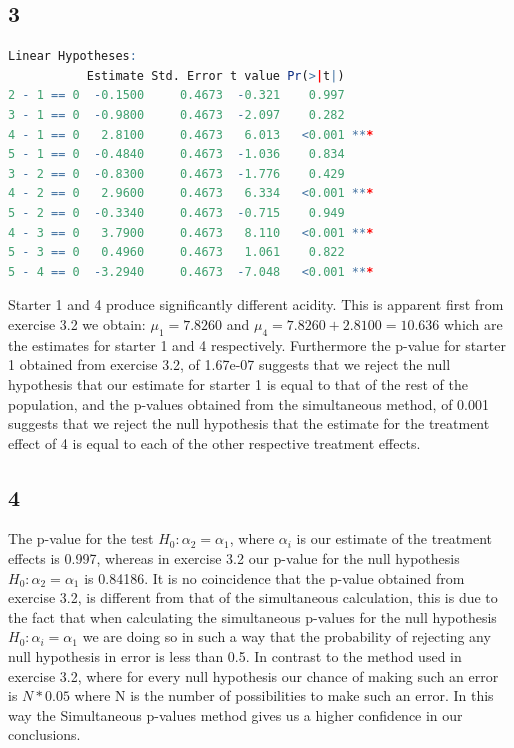 \documentclass{article}
\begin{document}
    \subsection*{3}
      \begin{lstlisting}[language=R]
Linear Hypotheses:
           Estimate Std. Error t value Pr(>|t|)    
2 - 1 == 0  -0.1500     0.4673  -0.321    0.997    
3 - 1 == 0  -0.9800     0.4673  -2.097    0.282    
4 - 1 == 0   2.8100     0.4673   6.013   <0.001 ***
5 - 1 == 0  -0.4840     0.4673  -1.036    0.834    
3 - 2 == 0  -0.8300     0.4673  -1.776    0.429    
4 - 2 == 0   2.9600     0.4673   6.334   <0.001 ***
5 - 2 == 0  -0.3340     0.4673  -0.715    0.949    
4 - 3 == 0   3.7900     0.4673   8.110   <0.001 ***
5 - 3 == 0   0.4960     0.4673   1.061    0.822    
5 - 4 == 0  -3.2940     0.4673  -7.048   <0.001 ***
      \end{lstlisting}
      \label{tble:p-values}
        Starter 1 and 4 produce significantly different acidity. This is apparent first from exercise 3.2 we obtain: $\mu_1 = 7.8260$ and $\mu_4 = 7.8260 + 2.8100 = 10.636$ which are the estimates for starter 1 and 4 respectively. Furthermore the p-value for starter 1 obtained from exercise 3.2, of 1.67e-07 suggests that we reject the null hypothesis that our estimate for starter 1 is equal to that of the rest of the population, and the p-values obtained from the simultaneous method, of 0.001 suggests that we reject the null hypothesis that the estimate for the treatment effect of 4 is equal to each of the other respective treatment effects.
    \subsection*{4}
    The p-value for the test $H_0: \alpha_2 = \alpha_1$, where $\alpha_i$ is our estimate of the treatment effects is 0.997, whereas in exercise 3.2 our p-value for the null hypothesis $H_0: \alpha_2 = \alpha_1$ is 0.84186. It is no coincidence that the p-value obtained from exercise 3.2, is different from that of the simultaneous calculation, this is due to the fact that when calculating the simultaneous p-values for the null hypothesis  $H_0: \alpha_i = \alpha_1$ we are doing so in such a way that the probability of rejecting any null hypothesis in error is less than 0.5. In contrast to the method used in exercise 3.2, where for every null hypothesis our chance of making such an error is $N*0.05$ where N is the number of possibilities to make such an error. In this way the Simultaneous p-values method gives us a higher confidence in our conclusions.
\end{document}
